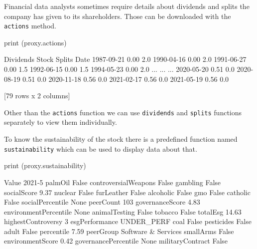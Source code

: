 Financial data analysts sometimes require details about dividends and splits the company has given to its shareholders. Those can be downloaded with the \texttt{actions} method.

\begin{ipython}
print (proxy.actions)
\end{ipython}
\begin{ioutput}
            Dividends  Stock Splits
Date                               
1987-09-21       0.00           2.0
1990-04-16       0.00           2.0
1991-06-27       0.00           1.5
1992-06-15       0.00           1.5
1994-05-23       0.00           2.0
...               ...           ...
2020-05-20       0.51           0.0
2020-08-19       0.51           0.0
2020-11-18       0.56           0.0
2021-02-17       0.56           0.0
2021-05-19       0.56           0.0

[79 rows x 2 columns]
\end{ioutput}

Other than the \texttt{actions} function we can use \texttt{dividends} and \texttt{splits} functions separately to view them individually.

To know the sustainability of the stock there is a predefined function named \texttt{sustainability} which can be used to display data about that.

\begin{ipython}
print (proxy.sustainability)
\end{ipython}
\begin{ioutput}
                                     Value
2021-5                                    
palmOil                              False
controversialWeapons                 False
gambling                             False
socialScore                           9.37
nuclear                              False
furLeather                           False
alcoholic                            False
gmo                                  False
catholic                             False
socialPercentile                      None
peerCount                              103
governanceScore                       4.83
environmentPercentile                 None
animalTesting                        False
tobacco                              False
totalEsg                             14.63
highestControversy                       3
esgPerformance                  UNDER_PERF
coal                                 False
pesticides                           False
adult                                False
percentile                            7.59
peerGroup              Software & Services
smallArms                            False
environmentScore                      0.42
governancePercentile                  None
militaryContract                     False
\end{ioutput}

